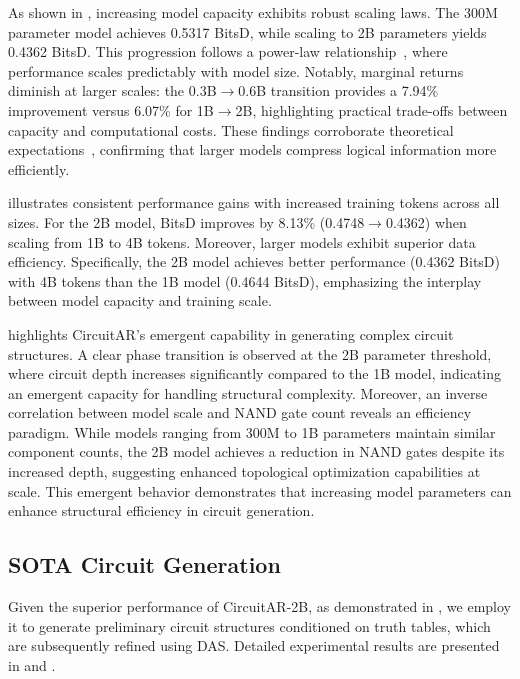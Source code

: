 As shown in , increasing model capacity exhibits robust scaling laws. 
The 300M parameter model achieves 0.5317 BitsD, while scaling to 2B parameters yields 0.4362 BitsD. 
This progression follows a power-law relationship~\cite{kaplan2020scaling}, where performance scales predictably with model size. 
Notably, marginal returns diminish at larger scales: the 0.3B$\rightarrow$0.6B transition provides a 7.94\% improvement versus 6.07\% for 1B$\rightarrow$2B, highlighting practical trade-offs between capacity and computational costs. 
These findings corroborate theoretical expectations~\cite{thomas2006informationtheory}, confirming that larger models compress logical information more efficiently.

 illustrates consistent performance gains with increased training tokens across all sizes.
For the 2B model, BitsD improves by 8.13\% (0.4748$\rightarrow$0.4362) when scaling from 1B to 4B tokens.  
Moreover, larger models exhibit superior data efficiency.
Specifically, the 2B model achieves better performance (0.4362 BitsD) with 4B tokens than the 1B model (0.4644 BitsD), emphasizing the interplay between model capacity and training scale.

 highlights CircuitAR's emergent capability in generating complex circuit structures. 
A clear phase transition is observed at the 2B parameter threshold, where circuit depth increases significantly compared to the 1B model, indicating an emergent capacity for handling structural complexity. Moreover, an inverse correlation between model scale and NAND gate count reveals an efficiency paradigm. 
While models ranging from 300M to 1B parameters maintain similar component counts, the 2B model achieves a reduction in NAND gates despite its increased depth, suggesting enhanced topological optimization capabilities at scale. 
This emergent behavior demonstrates that increasing model parameters can enhance structural efficiency in circuit generation.

\subsection{SOTA Circuit Generation}
Given the superior performance of CircuitAR-2B, as demonstrated in , we employ it to generate preliminary circuit structures conditioned on truth tables, which are subsequently refined using DAS. 
Detailed experimental results are presented in  and .

